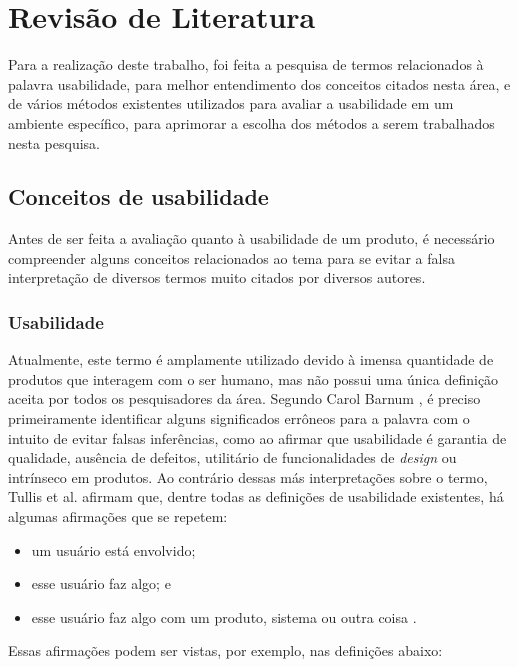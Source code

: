 \chapter{Revisão de Literatura}
\label{cap:revisao}

	Para a realização deste trabalho, foi feita a pesquisa de termos relacionados à palavra usabilidade, para melhor entendimento dos conceitos citados nesta área, e de vários métodos existentes utilizados para avaliar a usabilidade em um ambiente específico, para aprimorar a escolha dos métodos a serem trabalhados nesta pesquisa. 

\section{Conceitos de usabilidade}
\label{sec:conceitos}
	Antes de ser feita a avaliação quanto à usabilidade de um produto, é necessário compreender alguns conceitos relacionados ao tema para se evitar a falsa interpretação de diversos termos muito citados por diversos autores.

\subsection{Usabilidade}
\label{sec:usabilidade}
	Atualmente, este termo é amplamente utilizado devido à imensa quantidade de produtos que interagem com o ser humano, mas não possui uma única definição aceita por todos os pesquisadores da área. Segundo Carol Barnum \cite{barnum:01}, é preciso primeiramente identificar alguns significados errôneos para a palavra com o intuito de evitar falsas inferências, como ao afirmar que usabilidade é garantia de qualidade, ausência de defeitos, utilitário de funcionalidades de \emph{design} ou intrínseco em produtos. Ao contrário dessas más interpretações sobre o termo, Tullis et al. \cite{tullis:13} afirmam que, dentre todas as definições de usabilidade existentes, há algumas afirmações que se repetem:

\begin{itemize}
\item  um usuário está envolvido;
\item  esse usuário faz algo; e
\item  esse usuário faz algo com um produto, sistema ou outra coisa \cite{tullis:13}.
\end{itemize}
Essas afirmações podem ser vistas, por exemplo, nas definições abaixo:

